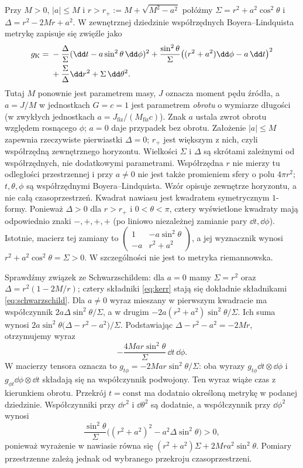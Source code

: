 \begin{przyklad}[Kerr]
\label{prz:metryka-kerr}
Przy $M>0$, $|a|\leq M$ i
$r>r_+:=M+\sqrt{M^2-a^2}$ połóżmy
$\Sigma=r^2+a^2\cos^2\theta$ i
$\Delta=r^2-2Mr+a^2$. W zewnętrznej
dziedzinie współrzędnych Boyera--Lindquista
metrykę zapisuje się zwięźle jako
\begin{align}\label{eq:kerr}
 g_{\mathrm K}
 ={}&-\frac{\Delta}{\Sigma}
       (\dd t-a\sin^2\theta\,\dd\phi)^2
  +\frac{\sin^2\theta}{\Sigma}
       \bigl((r^2+a^2)\dd\phi-a\,\dd t\bigr)^2\\
 &+\frac{\Sigma}{\Delta}\dd r^2
  +\Sigma\,\dd\theta^2.\notag
\end{align}
Tutaj $M$ ponownie jest parametrem masy,
$J$ oznacza moment pędu źródła, a
$a=J/M$ w jednostkach $G=c=1$ jest parametrem
\emph{obrotu} o wymiarze długości
(w zwykłych jednostkach $a=J_{\mathrm{fiz}}/
(M_{\mathrm{fiz}}c)$). Znak $a$ ustala zwrot
obrotu względem rosnącego $\phi$; $a=0$ daje
przypadek bez obrotu. Założenie $|a|\leq M$
zapewnia rzeczywiste pierwiastki $\Delta=0$;
$r_+$ jest większym z nich, czyli współrzędną
zewnętrznego horyzontu. Wielkości $\Sigma$ i
$\Delta$ są skrótami zależnymi od współrzędnych,
nie dodatkowymi parametrami. Współrzędna $r$
nie mierzy tu odległości przestrzennej i przy
$a\ne0$ nie jest także promieniem sfery o polu
$4\pi r^2$; $t,\theta,\phi$ są współrzędnymi
Boyera--Lindquista. Wzór opisuje zewnętrze
horyzontu, a nie całą czasoprzestrzeń.
Kwadrat nawiasu jest kwadratem symetrycznym
$1$-formy. Ponieważ $\Delta>0$ dla $r>r_+$
i $0<\theta<\pi$, cztery wyświetlone
kwadraty mają odpowiednio znaki $-,+,+,+$
(po liniowo niezależnej zamianie pary
$\dd t,\dd\phi$). Istotnie, macierz tej zamiany to
$\left(\begin{smallmatrix}1&-a\sin^2\theta\\-a&r^2+a^2\end{smallmatrix}\right)$,
a jej wyznacznik wynosi $r^2+a^2\cos^2\theta=\Sigma>0$. W szczególności nie jest
to metryka riemannowska.

Sprawdźmy związek ze Schwarzschildem:
dla $a=0$ mamy $\Sigma=r^2$ oraz
$\Delta=r^2(1-2M/r)$; cztery składniki
\eqref{eq:kerr} stają się dokładnie
składnikami \eqref{eq:schwarzschild}.
Dla $a\ne0$ wyraz mieszany w pierwszym kwadracie ma
współczynnik $2a\Delta\sin^2\theta/\Sigma$, a w drugim
$-2a(r^2+a^2)\sin^2\theta/\Sigma$.
Ich suma wynosi
$2a\sin^2\theta\bigl(\Delta-r^2-a^2\bigr)/\Sigma$.
Podstawiając $\Delta-r^2-a^2=-2Mr$, otrzymujemy wyraz
\[
 -\frac{4Mar\sin^2\theta}{\Sigma}
      \,\dd t\,\dd\phi.
\]
W macierzy tensora oznacza to
$g_{t\phi}=-2Mar\sin^2\theta/\Sigma$:
oba wyrazy $g_{t\phi}\dd t\otimes\dd\phi$
i $g_{\phi t}\dd\phi\otimes\dd t$ składają
się na współczynnik podwojony.
Ten wyraz wiąże czas z kierunkiem obrotu.
Przekrój $t=\mathrm{const}$ ma dodatnio określoną
metrykę w podanej dziedzinie. Współczynniki przy
$\dd r^2$ i $\dd\theta^2$ są dodatnie, a współczynnik
przy $\dd\phi^2$ wynosi
\[
 \frac{\sin^2\theta}{\Sigma}
 \bigl((r^2+a^2)^2-a^2\Delta\sin^2\theta\bigr)>0,
\]
ponieważ wyrażenie w nawiasie równa się
$(r^2+a^2)\Sigma+2Mr a^2\sin^2\theta$.
Pomiary przestrzenne zależą jednak od wybranego
przekroju czasoprzestrzeni.
\end{przyklad}

